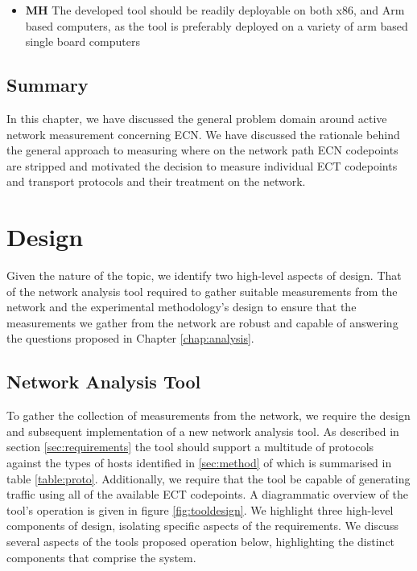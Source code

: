 \documentclass{l4proj}
\begin{document}
\begin{itemize}
    \item \textbf{MH} The developed tool should be readily deployable on both x86, and Arm based computers, as the tool is preferably deployed on a variety of arm based single board computers
\end{itemize}

\section{Summary}

In this chapter, we have discussed the general problem domain around active network measurement concerning ECN. We have discussed the rationale behind the general approach to measuring where on the network path ECN codepoints are stripped and motivated the decision to measure individual ECT codepoints and transport protocols and their treatment on the network.




\chapter{Design}
\label{chap:design}

Given the nature of the topic, we identify two high-level aspects of design. That of the network analysis tool required to gather suitable measurements from the network and the experimental methodology's design to ensure that the measurements we gather from the network are robust and capable of answering the questions proposed in Chapter \ref{chap:analysis}.

\section{Network Analysis Tool}
\label{sec:tooldesign}

To gather the collection of measurements from the network, we require the design and subsequent implementation of a new network analysis tool. As described in section \ref{sec:requirements} the tool should support a multitude of protocols against the types of hosts identified in \ref{sec:method} of which is summarised in table \ref{table:proto}. Additionally, we require that the tool be capable of generating traffic using all of the available ECT codepoints. A diagrammatic overview of the tool's operation is given in figure \ref{fig:tooldesign}. We highlight three high-level components of design, isolating specific aspects of the requirements. We discuss several aspects of the tools proposed operation below, highlighting the distinct components that comprise the system.
\end{document}
